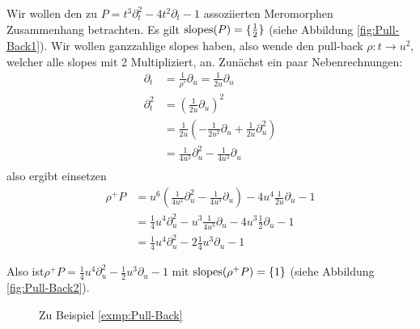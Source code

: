 \begin{exmp}
Wir wollen den zu $P= t^3\partial_t^2-4t^2\partial_t-1$ assoziierten
Meromorphen Zusammenhang
betrachten.
Es gilt $ \operatorname{slopes}(P)=\{\frac{1}{2}\} $ (siehe Abbildung
\ref{fig:Pull-Back1}).
Wir wollen ganzzahlige slopes haben, also wende den pull-back
$\rho:t\rightarrow u^2$, welcher alle slopes mit 2 Multipliziert,
an.
Zunächst ein paar Nebenrechnungen:
\begin{align*}
\partial_t   &= \frac{1}{\rho'}\partial_u=\frac{1}{2u}\partial_u \\
\partial_t^2 &= (\frac{1}{2u}\partial_u)^2\\
&= \frac{1}{2u}(-\frac{1}{2u^2}\partial_u +
\frac{1}{2u}\partial_u^2) \\
&= \frac{1}{4u^2}\partial_u^2-\frac{1}{4u^3}\partial_u \\
\end{align*}
also ergibt einsetzen
\begin{align*}
\rho^+P &= u^6(\frac{1}{4u^2}\partial_u^2-\frac{1}{4u^3}\partial_u)-
4u^{4}\frac{1}{2u}\partial_u-1\\
&= \frac{1}{4}u^4\partial_u^2-u^3\frac{1}{4u^3}\partial_u-
4u^{3}\frac{1}{2}\partial_u-1\\
&= \frac{1}{4}u^4\partial_u^2 -2\frac{1}{4}u^3\partial_u-1
\end{align*}

Also ist$\rho^+P= \frac{1}{4}u^4\partial_u^2 -\frac{1}{2}u^3\partial_u-1$ mit
$ \operatorname{slopes}(\rho^+P)=\{1\} $ (siehe Abbildung \ref{fig:Pull-Back2}).
\begin{figure}[h]
\label{fig:Pull-Back}
\caption{Zu Beispiel \ref{exmp:Pull-Back}}
\begin{center}
\quad
{}
\end{center}
\end{figure}
\end{exmp}

